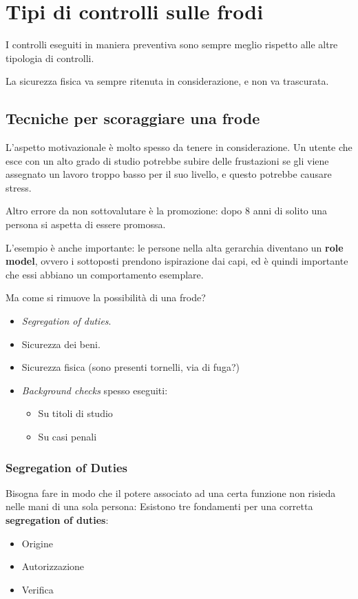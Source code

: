 \section{Tipi di controlli sulle frodi}


I controlli eseguiti in maniera preventiva sono sempre meglio rispetto alle 
altre tipologia di controlli.

La sicurezza fisica va sempre ritenuta in considerazione, e non va trascurata.

\subsection{Tecniche per scoraggiare una frode}

L'aspetto motivazionale è molto spesso da tenere in considerazione.
Un utente che esce con un alto grado di studio potrebbe subire delle 
frustazioni se gli viene assegnato un lavoro troppo basso per il suo livello, e 
questo potrebbe causare stress.

Altro errore da non sottovalutare è la promozione: dopo 8 anni di solito una 
persona si aspetta di essere promossa.

L'esempio è anche importante: le persone nella alta gerarchia diventano un 
\textbf{role model}, ovvero i sottoposti prendono ispirazione dai capi, ed è 
quindi importante che essi abbiano un comportamento esemplare.

Ma come si rimuove la possibilità di una frode?
\begin{itemize}
  \item \textit{Segregation of duties}.
  \item Sicurezza dei beni.
  \item Sicurezza fisica (sono presenti tornelli, via di fuga?)
  \item \textit{Background checks} spesso eseguiti:
  \begin{itemize}
    \item Su titoli di studio
    \item Su casi penali
  \end{itemize}
\end{itemize}

\subsubsection{Segregation of Duties}

Bisogna fare in modo che il potere associato ad una certa funzione non risieda 
nelle mani di una sola persona:
Esistono tre fondamenti per una corretta \textbf{segregation of duties}:
\begin{itemize}
  \item Origine
  \item Autorizzazione
  \item Verifica
\end{itemize}

